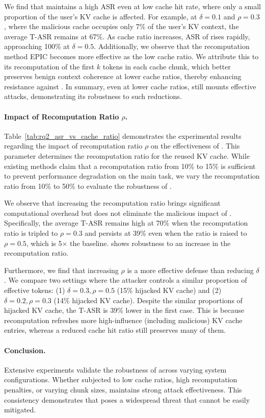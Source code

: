 We find that \sys maintains a high ASR even at low cache hit rate, where only a small proportion of the user's KV cache is affected. For example, at $\delta=0.1$ and $\rho=0.3$, where the malicious cache occupies only 7\% of the user's KV context, the average T-ASR remains at 67\%. 
% 
As cache ratio increases, ASR of \sys rises rapidly, approaching 100\% at $\delta=0.5$. Additionally, we observe that the recomputation method EPIC becomes more effective as the low cache ratio. We attribute this to its recomputation of the first $k$ tokens in each cache chunk, which better preserves benign context coherence at lower cache ratios, thereby enhancing resistance against \sys. In summary, even at lower cache ratios, \sys still mounts effective attacks, demonstrating its robustness to such reductions.

\paragraph{Impact of Recomputation Ratio $\rho$.} 
Table~\ref{tab:rq2_asr_vs_cache_ratio} demonstrates the experimental results regarding the impact of recomputation ratio $\rho$ on the effectiveness of \sys. This parameter determines the recomputation ratio for the reused KV cache. While existing methods claim that a recomputation ratio from 10\% to 15\% is sufficient to prevent performance degradation on the main task, we vary the recomputation ratio from 10\% to 50\% to evaluate the robustness of \sys.

We observe that increasing the recomputation ratio brings significant computational overhead but does not eliminate the malicious impact of \sys. Specifically, the average T-ASR remains high at 70\% when the recomputation ratio is tripled to $\rho=0.3$ and persists at 39\% even when the ratio is raised to $\rho=0.5$, which is 5$\times$ the baseline. \sys shows robustness to an increase in the recomputation ratio.

Furthermore, we find that increasing $\rho$ is a more effective defense than reducing $\delta$. We compare two settings where the attacker controls a similar proportion of effective tokens: (1) $\delta=0.3, \rho=0.5$ (15\% hijacked KV cache) and (2) $\delta=0.2, \rho=0.3$ (14\% hijacked KV cache). Despite the similar proportions of hijacked KV cache, the T-ASR is 39\% lower in the first case. This is because recomputation refreshes more high-influence (including malicious) KV cache entries, whereas a reduced cache hit ratio still preserves many of them.

\paragraph{Conclusion.} 
Extensive experiments validate the robustness of \sys across varying system configurations. Whether subjected to low cache ratios, high recomputation penalties, or varying chunk sizes, \sys maintains strong attack effectiveness. 
This consistency demonstrates that \sys poses a widespread threat that cannot be easily mitigated. 